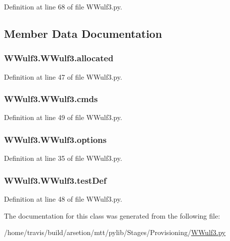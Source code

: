 Definition at line 68 of file W\-Wulf3.\-py.



\subsection{Member Data Documentation}
\hypertarget{classWWulf3_1_1WWulf3_ad83bab03cfcdab3a5b689a0958db19e8}{
\subsubsection[{allocated}]{\setlength{\rightskip}{0pt plus 5cm}W\-Wulf3.\-W\-Wulf3.\-allocated}}\label{classWWulf3_1_1WWulf3_ad83bab03cfcdab3a5b689a0958db19e8}


Definition at line 47 of file W\-Wulf3.\-py.

\hypertarget{classWWulf3_1_1WWulf3_afb4fb9db2456e29872155d9b8738418f}{
\subsubsection[{cmds}]{\setlength{\rightskip}{0pt plus 5cm}W\-Wulf3.\-W\-Wulf3.\-cmds}}\label{classWWulf3_1_1WWulf3_afb4fb9db2456e29872155d9b8738418f}


Definition at line 49 of file W\-Wulf3.\-py.

\hypertarget{classWWulf3_1_1WWulf3_adff5ffd43f8b68d49c7b45ab48d7b428}{
\subsubsection[{options}]{\setlength{\rightskip}{0pt plus 5cm}W\-Wulf3.\-W\-Wulf3.\-options}}\label{classWWulf3_1_1WWulf3_adff5ffd43f8b68d49c7b45ab48d7b428}


Definition at line 35 of file W\-Wulf3.\-py.

\hypertarget{classWWulf3_1_1WWulf3_a9e8732432df9211bd64454c4c0e04098}{
\subsubsection[{test\-Def}]{\setlength{\rightskip}{0pt plus 5cm}W\-Wulf3.\-W\-Wulf3.\-test\-Def}}\label{classWWulf3_1_1WWulf3_a9e8732432df9211bd64454c4c0e04098}


Definition at line 48 of file W\-Wulf3.\-py.



The documentation for this class was generated from the following file\-:\begin{DoxyCompactItemize}
\item 
/home/travis/build/arsetion/mtt/pylib/\-Stages/\-Provisioning/\hyperlink{WWulf3_8py}{W\-Wulf3.\-py}\end{DoxyCompactItemize}
